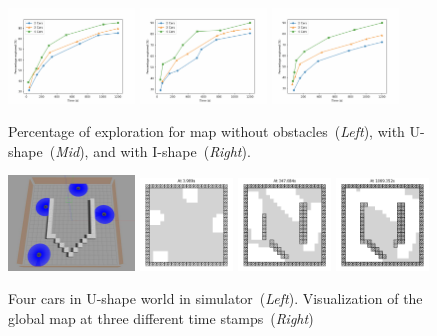 \begin{figure}[t]
\includegraphics[width=0.3\textwidth]{figs/exp-empty.png}
\includegraphics[width=0.3\textwidth]{figs/exp-u-shape.png}
\includegraphics[width=0.3\textwidth]{figs/exp-i-shape.png}
\caption{Percentage of exploration for map without obstacles~(\emph{Left}), with U-shape~(\emph{Mid}), and with I-shape~(\emph{Right}).}\label{fig:percent}
\end{figure}

\begin{figure}
\includegraphics[width=0.3\textwidth]{figs/exp-gazebo.jpg}
\includegraphics[width=0.22\textwidth]{figs/exp-progress-1.png}
\includegraphics[width=0.22\textwidth]{figs/exp-progress-2.png}
\includegraphics[width=0.22\textwidth]{figs/exp-progress-3.png}
\caption{Four cars in U-shape world in simulator~(\emph{Left}). Visualization of the global map at three different time stamps~(\emph{Right})}\label{fig:U-map-progress}
\end{figure}

